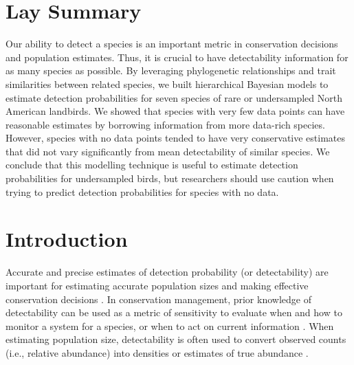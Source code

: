 \documentclass[12pt]{article}
\providecommand{\DIFaddbegin}{} %
\newcommand{\DIFaddincludegraphics}[2][]{{\color{blue}\fbox{\DIFOincludegraphics[#1]{#2}}}} %
\DeclareRobustCommand{\DIFaddbegin}{\DIFOaddbegin \let\includegraphics\DIFaddincludegraphics} %
\begin{document}
\section{Lay Summary}
\par Our ability to detect a species is an important metric in conservation decisions and population estimates. 
Thus, it is crucial to have detectability information for as many species as possible.
By leveraging phylogenetic relationships and trait similarities between related species, we built hierarchical Bayesian models to estimate detection probabilities for seven species of rare or undersampled North American landbirds.
We showed that species with very few data points can have reasonable estimates by borrowing information from more data-rich species.
However, species with no data points tended to have very conservative estimates that did not vary significantly from mean detectability of similar species.
We conclude that this modelling technique is useful to estimate detection probabilities for undersampled birds, but researchers should use caution when trying to predict detection probabilities for species with no data.

\section{Introduction}

\par Accurate and precise estimates of detection probability (or detectability) are important for estimating accurate population sizes and making effective conservation decisions \citep{bennett_how_2024}.
In conservation management, prior knowledge of detectability can be used as a metric of sensitivity to evaluate when and how to monitor a system for a species, or when to act on current information \citep{canessa_when_2015, bennett_when_2018}. 
When estimating population size, detectability is often used to convert observed counts (i.e., relative abundance) into densities or estimates of true abundance \citep{solymos_calibrating_2013, johnson_defense_2008}.
\DIFaddbegin 
\end{document}
